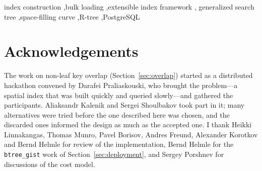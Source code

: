 \documentclass[preprint, 11pt]{elsarticle}
\newcommand{\code}[1]{\texttt{#1}}
\begin{document}
\begin{frontmatter}
\begin{abstract}
The design is implemented in PostgreSQL, has shipped since release~14 and has
been the default strategy for a family of operator classes since release~18. It
is evaluated on uniform and clustered synthetic data and on 138 million
OpenStreetMap coordinates, against insertion-based construction,
occupancy-based sorted construction and Hilbert-order packing, together with a
five-year deployment history including the one case in which the correctness
condition of the method was violated in production. Two findings were not
anticipated: the order and the split rule interact asymmetrically, an elaborate
space-filling curve helping only while the split rule is naive; and on the real
dataset insertion produces the \emph{worst} tree of the three, which if
confirmed makes sorted construction an improvement on both axes rather than a
trade.
\end{abstract}

\begin{keyword}
index construction \sep bulk loading \sep extensible index framework \sep
generalized search tree \sep space-filling curve \sep R-tree \sep PostgreSQL
\end{keyword}

\end{frontmatter}




\section*{Acknowledgements}

The work on non-leaf key overlap (Section~\ref{sec:overlap}) started as a
distributed hackathon convened by Darafei Praliaskouski, who brought the
problem---a spatial index that was built quickly and queried slowly---and
gathered the participants. Aliaksandr Kalenik and Sergei Shoulbakov took part in
it; many alternatives were tried before the one described here was chosen, and
the discarded ones informed the design as much as the accepted one. I thank
Heikki Linnakangas, Thomas Munro, Pavel Borisov, Andres Freund, Alexander
Korotkov and Bernd Helmle for review of the implementation, Bernd Helmle for the
\code{btree\_gist} work of Section~\ref{sec:deployment}, and Sergey Porshnev for
discussions of the cost model.



\end{document}

